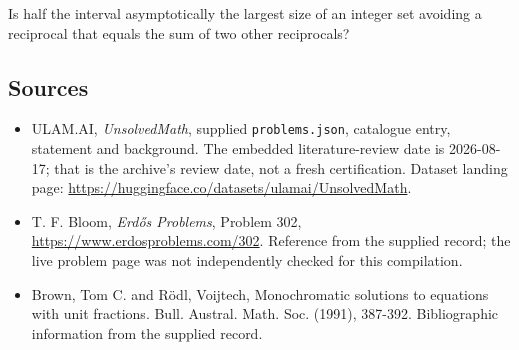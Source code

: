 \documentclass[11pt,a4paper]{article}
\begin{document}
Is half the interval asymptotically the largest size of an integer set avoiding a reciprocal that equals the sum of two other reciprocals?

\subsection{Sources}

{\small

\begin{itemize}

\item[\hypertarget{source:statement:1}{S1}] ULAM.AI, \emph{UnsolvedMath}, supplied \texttt{problems.json}, catalogue entry, statement and background. The embedded literature-review date is 2026-08-17; that is the archive’s review date, not a fresh certification. Dataset landing page: \url{https://huggingface.co/datasets/ulamai/UnsolvedMath}.

\item[\hypertarget{source:statement:2}{S2}] T. F. Bloom, \emph{Erdős Problems}, Problem 302, \url{https://www.erdosproblems.com/302}. Reference from the supplied record; the live problem page was not independently checked for this compilation.

\item[\hypertarget{source:statement:3}{S3}] Brown, Tom C. and R\"{o}dl, Voijtech, Monochromatic solutions to equations with unit fractions. Bull. Austral. Math. Soc. (1991), 387-392. Bibliographic information from the supplied record.

\end{itemize}

}

\label{end:statement}
\end{document}
